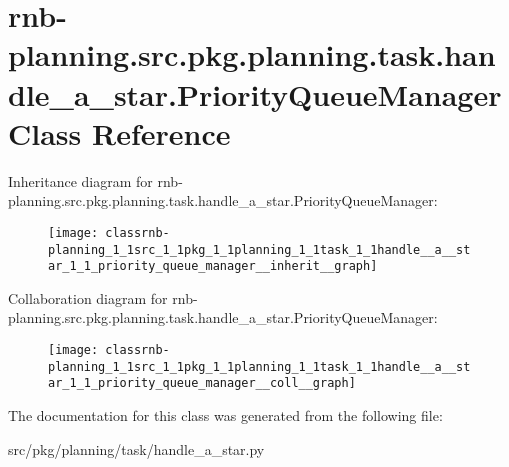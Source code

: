 \hypertarget{classrnb-planning_1_1src_1_1pkg_1_1planning_1_1task_1_1handle__a__star_1_1_priority_queue_manager}{}\section{rnb-\/planning.src.\+pkg.\+planning.\+task.\+handle\+\_\+a\+\_\+star.\+Priority\+Queue\+Manager Class Reference}
\label{classrnb-planning_1_1src_1_1pkg_1_1planning_1_1task_1_1handle__a__star_1_1_priority_queue_manager}


Inheritance diagram for rnb-\/planning.src.\+pkg.\+planning.\+task.\+handle\+\_\+a\+\_\+star.\+Priority\+Queue\+Manager\+:\nopagebreak
\begin{figure}[H]
\begin{center}
\leavevmode
\texttt{[image: classrnb-planning\_1\_1src\_1\_1pkg\_1\_1planning\_1\_1task\_1\_1handle\_\_a\_\_star\_1\_1\_priority\_queue\_manager\_\_inherit\_\_graph]}
\end{center}
\end{figure}


Collaboration diagram for rnb-\/planning.src.\+pkg.\+planning.\+task.\+handle\+\_\+a\+\_\+star.\+Priority\+Queue\+Manager\+:\nopagebreak
\begin{figure}[H]
\begin{center}
\leavevmode
\texttt{[image: classrnb-planning\_1\_1src\_1\_1pkg\_1\_1planning\_1\_1task\_1\_1handle\_\_a\_\_star\_1\_1\_priority\_queue\_manager\_\_coll\_\_graph]}
\end{center}
\end{figure}


The documentation for this class was generated from the following file\+:\begin{DoxyCompactItemize}
\item 
src/pkg/planning/task/handle\+\_\+a\+\_\+star.\+py\end{DoxyCompactItemize}
